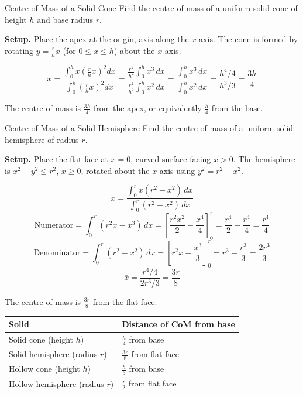 \documentclass[12pt, a4paper]{book}
\begin{document}
\begin{exmp}{Centre of Mass of a Solid Cone}{}
Find the centre of mass of a uniform solid cone of height $h$ and base radius $r$.

\medskip
\textbf{Setup.} Place the apex at the origin, axis along the $x$-axis. The cone is formed by rotating $y = \frac{r}{h}x$ (for $0 \leq x \leq h$) about the $x$-axis.

\[
  \bar{x} = \frac{\int_0^h x \left(\frac{r}{h}x\right)^2 dx}{\int_0^h \left(\frac{r}{h}x\right)^2 dx} = \frac{\frac{r^2}{h^2}\int_0^h x^3\,dx}{\frac{r^2}{h^2}\int_0^h x^2\,dx} = \frac{\int_0^h x^3\,dx}{\int_0^h x^2\,dx} = \frac{h^4/4}{h^3/3} = \frac{3h}{4}
\]

The centre of mass is $\frac{3h}{4}$ from the apex, or equivalently $\frac{h}{4}$ from the base.
\end{exmp}

\begin{exmp}{Centre of Mass of a Solid Hemisphere}{}
Find the centre of mass of a uniform solid hemisphere of radius $r$.

\medskip
\textbf{Setup.} Place the flat face at $x = 0$, curved surface facing $x > 0$. The hemisphere is $x^2 + y^2 \leq r^2$, $x \geq 0$, rotated about the $x$-axis using $y^2 = r^2 - x^2$.

\[
  \bar{x} = \frac{\int_0^r x(r^2-x^2)\,dx}{\int_0^r (r^2-x^2)\,dx}
\]
\[
  \text{Numerator} = \int_0^r (r^2x - x^3)\,dx = \left[\frac{r^2x^2}{2} - \frac{x^4}{4}\right]_0^r = \frac{r^4}{2} - \frac{r^4}{4} = \frac{r^4}{4}
\]
\[
  \text{Denominator} = \int_0^r (r^2 - x^2)\,dx = \left[r^2x - \frac{x^3}{3}\right]_0^r = r^3 - \frac{r^3}{3} = \frac{2r^3}{3}
\]
\[
  \bar{x} = \frac{r^4/4}{2r^3/3} = \frac{3r}{8}
\]

The centre of mass is $\frac{3r}{8}$ from the flat face.
\end{exmp}

\begin{center}
\begin{tabular}{ll}
\toprule
Solid & Distance of CoM from base \\
\midrule
Solid cone (height $h$) & $\frac{h}{4}$ from base \\
Solid hemisphere (radius $r$) & $\frac{3r}{8}$ from flat face \\
Hollow cone (height $h$) & $\frac{h}{3}$ from base \\
Hollow hemisphere (radius $r$) & $\frac{r}{2}$ from flat face \\
\bottomrule
\end{tabular}
\end{center}
\end{document}
